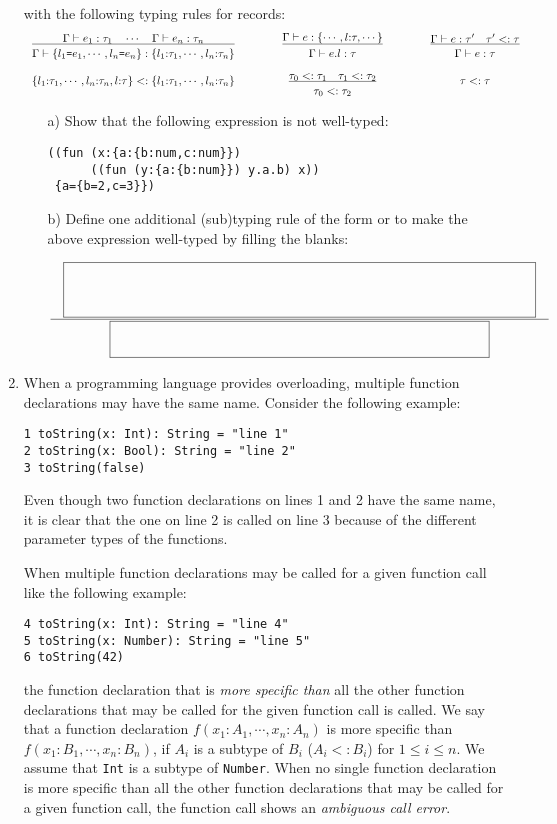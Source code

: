 \begin{enumerate}
with the following typing rules for records:
\[
\begin{array}{ccccc}
\newinfrule
{ \Gamma\vdash{e_1}:{\tau_1} \rulesep \cdots \rulesep \Gamma\vdash{e_n}:{\tau_n} }
{ \Gamma\vdash{\{l_1\texttt{=} e_1,\cdots,l_n\texttt{=} e_n\}}:{\{l_1{:}\tau_1,\cdots,l_n{:}\tau_n\}} }
&\qquad&
\newinfrule
{ \Gamma\vdash{e}:{\{\cdots,l{:}\tau,\cdots\}} }
{ \Gamma\vdash{{e.l}}:{\tau} }
&\qquad&
\newinfrule
{ \Gamma\vdash{e}:{\tau'} \rulesep {\tau'}<:{\tau} }
{ \Gamma\vdash{e}:{\tau} }
\\[2em]
\{l_1{:}\tau_1,\cdots,l_n{:}\tau_n,l{:}\tau\}<:\{l_1{:}\tau_1,\cdots,l_n{:}\tau_n\}
&\qquad&
\newinfrule
{ {\tau_0}<:{\tau_1} \rulesep {\tau_1}<:{\tau_2} }
{ {\tau_0}<:{\tau_2} }
&\qquad&
{\tau}<:{\tau}
\end{array}
\]

\begin{itemize}
\item[a)] Show that the following expression is not well-typed:
\begin{verbatim}
((fun (x:{a:{b:num,c:num}})
      ((fun (y:{a:{b:num}}) y.a.b) x))
 {a={b=2,c=3}})
\end{verbatim}

\item[b)] Define one additional (sub)typing rule of the form
 or \fbox{${\tau}<:{\tau}$}
to make the above expression well-typed by filling the blanks:

{
\[
\newinfrule
{ \lblank }
{ \mblank }
\]
}


\end{itemize}

\item When a programming language provides overloading,
multiple function declarations may have the same name.  Consider the following example:
\begin{verbatim}
1 toString(x: Int): String = "line 1"
2 toString(x: Bool): String = "line 2"
3 toString(false)
\end{verbatim}
Even though two function declarations on lines 1 and 2 have the same name,
it is clear that the one on line 2 is called on line 3 because of the different parameter types of the functions.

When multiple function declarations may be called for a given function call like the following example:
\begin{verbatim}
4 toString(x: Int): String = "line 4"
5 toString(x: Number): String = "line 5"
6 toString(42)
\end{verbatim}
the function declaration that is \emph{more specific than} all the other function declarations
that may be called for the given function call is called.
We say that a function declaration $f(x_1:A_1, \cdots, x_n:A_n)$ is more specific than $f(x_1:B_1, \cdots, x_n:B_n)$,
if $A_i$ is a subtype of $B_i$ ($A_i <: B_i$) for $1 \le i \le n$.
We assume that \verb!Int! is a subtype of \verb!Number!.
When no single function declaration is more specific than all the other function declarations
that may be called for a given function call,
the function call shows an \emph{ambiguous call error}.


\end{enumerate}
